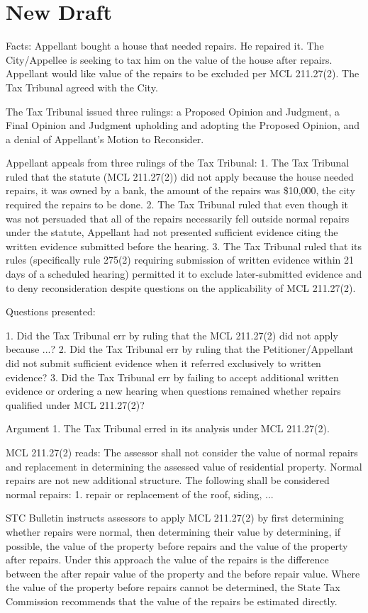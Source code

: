 \section{New Draft}

Facts: 
Appellant bought a house that needed repairs. He repaired it. The City/Appellee is seeking to tax him on the value of the house after repairs. Appellant would like value of the repairs to be excluded per MCL 211.27(2). The Tax Tribunal agreed with the City. 

The Tax Tribunal issued three rulings: a Proposed Opinion and Judgment, a Final Opinion and Judgment upholding and adopting the Proposed Opinion, and a denial of Appellant's Motion to Reconsider. 

Appellant appeals from three rulings of the Tax Tribunal: 
1. The Tax Tribunal ruled that the statute (MCL 211.27(2)) did not apply because the house needed repairs, it was owned by a bank, the amount of the repairs was \$10,000, the city required the repairs to be done.
2. The Tax Tribunal ruled that even though it was not persuaded that all of the repairs necessarily fell outside normal repairs under the statute, Appellant had not presented sufficient evidence citing the written evidence submitted before the hearing.  
3. The Tax Tribunal ruled that its rules (specifically rule 275(2) requiring submission of written evidence within 21 days of a scheduled hearing) permitted it to exclude later-submitted evidence and to deny reconsideration despite questions on the applicability of MCL 211.27(2). 

Questions presented:

1. Did the Tax Tribunal err by ruling that the MCL 211.27(2) did not apply because ...?
2. Did the Tax Tribunal err by ruling that the Petitioner/Appellant did not submit sufficient evidence when it referred exclusively to written evidence?
3. Did the Tax Tribunal err by failing to accept additional written evidence or ordering a new hearing when questions remained whether repairs qualified under MCL 211.27(2)?

Argument
1. The Tax Tribunal erred in its analysis under MCL 211.27(2).

MCL 211.27(2) reads: The assessor shall not consider the value of normal repairs and replacement in determining the assessed value of residential property. Normal repairs are not new additional structure. The following shall be considered normal repairs: 1. repair or replacement of the roof, siding, ...

STC Bulletin instructs assessors to apply MCL 211.27(2) by first determining whether repairs were normal, then determining their value by determining, if possible, the value of the property before repairs and the value of the property after repairs. Under this approach the value of the repairs is the difference between the after repair value of the property and the before repair value. Where the value of the property before repairs cannot be determined, the State Tax Commission recommends that the value of the repairs be estimated directly. 

